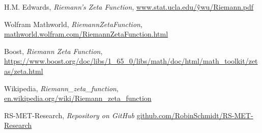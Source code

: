 \documentclass[12pt]{article}
\begin{document}
\begin{thebibliography}{9}
	
 H.M. Edwards, \textit{Riemann's Zeta Function},
\href{http://www.stat.ucla.edu/~ywu/Riemann.pdf}{www.stat.ucla.edu/\~ywu/Riemann.pdf}

 Wolfram Mathworld, \textit{RiemannZetaFunction},
\href{https://mathworld.wolfram.com/RiemannZetaFunction.html}{mathworld.wolfram.com/RiemannZetaFunction.html}

 Boost, \textit{Riemann Zeta Function}, \\
\href{https://www.boost.org/doc/libs/1_65_0/libs/math/doc/html/math_toolkit/zetas/zeta.html}{https://www.boost.org/doc/libs/1\_65\_0/libs/math/doc/html/math\_toolkit/zetas/zeta.html}

 Wikipedia, \textit{Riemann\_zeta\_function},
\href{https://en.wikipedia.org/wiki/Riemann_zeta_function}{en.wikipedia.org/wiki/Riemann\_zeta\_function}

 RS-MET-Research, \textit{Repository on GitHub}
\href{https://github.com/RobinSchmidt/RS-MET-Research}{github.com/RobinSchmidt/RS-MET-Research}



\end{thebibliography}
 
 
\end{document}
